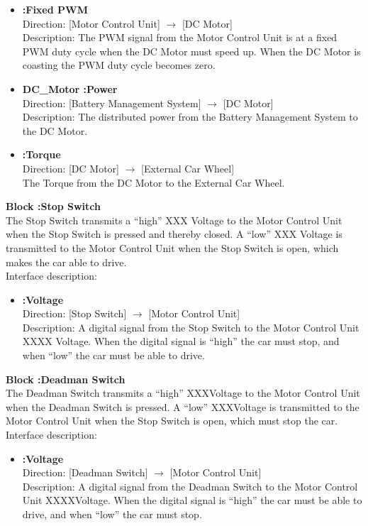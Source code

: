 \begin{itemize}
	\item \textbf{:Fixed PWM}\\
		Direction: [Motor Control Unit] $\rightarrow$ [DC Motor]\\
		Description: The PWM signal from the Motor Control Unit is at a fixed PWM duty cycle when the DC Motor must speed up. When the DC Motor is coasting the PWM duty cycle becomes zero.
	\item \textbf{DC\_Motor :Power}\\
		Direction: [Battery Management System] $\rightarrow$ [DC Motor]\\
		Description: The distributed power from the Battery Management System to the DC Motor.
	\item \textbf{:Torque}\\
		Direction: [DC Motor] $\rightarrow$ [External Car Wheel]\\
		The Torque from the DC Motor to the External Car Wheel.
\end{itemize}

\textbf{Block :Stop Switch}\\
The Stop Switch transmits a “high” XXX Voltage to the Motor Control Unit when the Stop Switch is pressed and thereby closed. A “low” XXX  Voltage is transmitted to the Motor Control Unit when the Stop Switch is open, which makes the car able to drive.\\
Interface description:

\begin{itemize}
	\item \textbf{:Voltage}\\
		Direction: [Stop Switch] $\rightarrow$ [Motor Control Unit]\\
		Description: A digital signal from the Stop Switch to the Motor Control Unit XXXX Voltage. When the digital signal is “high” the car must stop, and when “low” the car must be able to drive.
\end{itemize}

\textbf{Block :Deadman Switch}\\
The Deadman Switch transmits a “high” XXXVoltage to the Motor Control Unit when the Deadman Switch is pressed. A “low” XXXVoltage is transmitted to the Motor Control Unit when the Stop Switch is open, which must stop the car.
Interface description:

\begin{itemize}
	\item \textbf{:Voltage}\\
		Direction: [Deadman Switch] $\rightarrow$ [Motor Control Unit]\\
		Description: A digital signal from the Deadman Switch to the Motor Control Unit XXXXVoltage. When the digital signal is “high” the car must be able to drive, and when “low” the car must stop.
\end{itemize}

